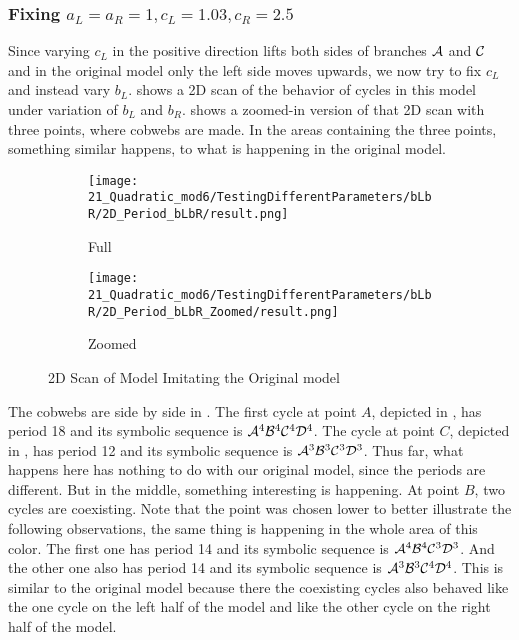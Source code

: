 \subsubsection{Fixing $a_L = a_R = 1, c_L = 1.03, c_R = 2.5$}

Since varying $c_L$ in the positive direction lifts both sides of branches $\mathcal{A}$ and $\mathcal{C}$ and in the original model only the left side moves upwards, we now try to fix $c_L$ and instead vary $b_L$.
 shows a 2D scan of the behavior of cycles in this model under variation of $b_L$ and $b_R$.
 shows a zoomed-in version of that 2D scan with three points, where cobwebs are made.
In the areas containing the three points, something similar happens, to what is happening in the original model.

\begin{figure}
    \centering
    \begin{subfigure}{0.4\textwidth}
        \centering
        \texttt{[image: 21\_Quadratic\_mod6/TestingDifferentParameters/bLbR/2D\_Period\_bLbR/result.png]}
        \caption{Full}
        \label{fig:quadratic.full.bLbR.2d.full}
    \end{subfigure}
    \begin{subfigure}{0.4\textwidth}
        \centering
        \texttt{[image: 21\_Quadratic\_mod6/TestingDifferentParameters/bLbR/2D\_Period\_bLbR\_Zoomed/result.png]}
        \caption{Zoomed}
        \label{fig:quadratic.full.bLbR.2d.z}
    \end{subfigure}
    \caption{2D Scan of Model Imitating the Original model }
\end{figure}

The cobwebs are side by side in .
The first cycle at point $A$, depicted in , has period 18 and its symbolic sequence is $\mathcal{A}^4\mathcal{B}^4\mathcal{C}^4\mathcal{D}^4$.
The cycle at point $C$, depicted in , has period 12 and its symbolic sequence is $\mathcal{A}^3\mathcal{B}^3\mathcal{C}^3\mathcal{D}^3$.
Thus far, what happens here has nothing to do with our original model, since the periods are different.
But in the middle, something interesting is happening.
At point $B$, two cycles are coexisting.
Note that the point was chosen lower to better illustrate the following observations, the same thing is happening in the whole area of this color.
The first one has period 14 and its symbolic sequence is $\mathcal{A}^4\mathcal{B}^4\mathcal{C}^3\mathcal{D}^3$.
And the other one also has period 14 and its symbolic sequence is $\mathcal{A}^3\mathcal{B}^3\mathcal{C}^4\mathcal{D}^4$.
This is similar to the original model because there the coexisting cycles also behaved like the one cycle on the left half of the model and like the other cycle on the right half of the model.

